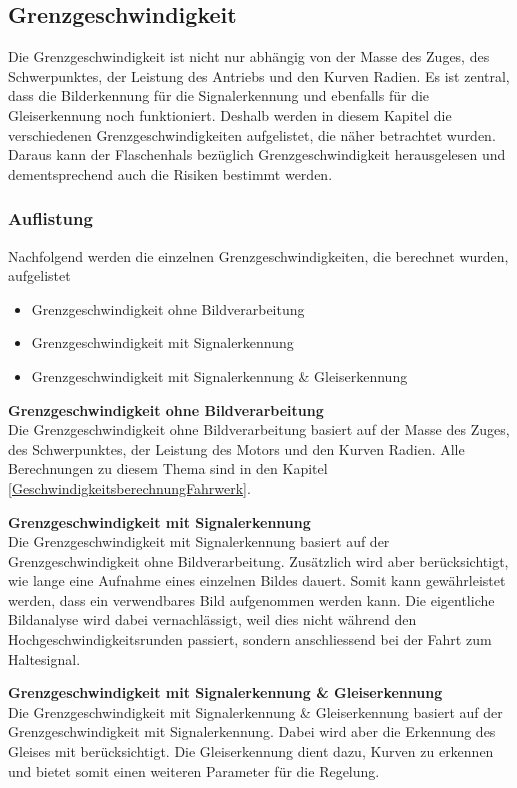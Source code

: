 \documentclass[../../main.tex]{subfiles}
\begin{document}
\subsection{Grenzgeschwindigkeit}
Die Grenzgeschwindigkeit ist nicht nur abhängig von der Masse des Zuges, des Schwerpunktes, der Leistung des Antriebs und den Kurven Radien.
Es ist zentral, dass die Bilderkennung für die Signalerkennung und ebenfalls für die Gleiserkennung noch funktioniert.
Deshalb werden in diesem Kapitel die verschiedenen Grenzgeschwindigkeiten aufgelistet, die näher betrachtet wurden.
Daraus kann der Flaschenhals bezüglich Grenzgeschwindigkeit herausgelesen und dementsprechend auch die Risiken
bestimmt werden.

\subsubsection{Auflistung}
Nachfolgend werden die einzelnen Grenzgeschwindigkeiten, die berechnet wurden, aufgelistet
\begin{itemize} %
    \item Grenzgeschwindigkeit ohne Bildverarbeitung
    \item Grenzgeschwindigkeit mit Signalerkennung
    \item Grenzgeschwindigkeit mit Signalerkennung \& Gleiserkennung
\end{itemize}

\textbf{Grenzgeschwindigkeit ohne Bildverarbeitung} \\
Die Grenzgeschwindigkeit ohne Bildverarbeitung basiert auf der Masse des Zuges, des Schwerpunktes, der Leistung des Motors und den Kurven Radien.
Alle Berechnungen zu diesem Thema sind in den Kapitel \ref{GeschwindigkeitsberechnungFahrwerk}.

\textbf{Grenzgeschwindigkeit mit Signalerkennung} \\
Die Grenzgeschwindigkeit mit Signalerkennung basiert auf der Grenzgeschwindigkeit ohne Bildverarbeitung. Zusätzlich wird aber berücksichtigt, wie lange eine
Aufnahme eines einzelnen Bildes dauert. Somit kann gewährleistet werden, dass ein verwendbares Bild aufgenommen werden kann. Die eigentliche Bildanalyse
wird dabei vernachlässigt, weil dies nicht während den Hochgeschwindigkeitsrunden passiert, sondern anschliessend bei der Fahrt zum Haltesignal.

\textbf{Grenzgeschwindigkeit mit Signalerkennung \& Gleiserkennung} \\
Die Grenzgeschwindigkeit mit Signalerkennung \& Gleiserkennung basiert auf der Grenzgeschwindigkeit mit Signalerkennung. Dabei wird aber die Erkennung des Gleises
mit berücksichtigt. Die Gleiserkennung dient dazu, Kurven zu erkennen und bietet somit einen weiteren Parameter für die Regelung.
\end{document}
